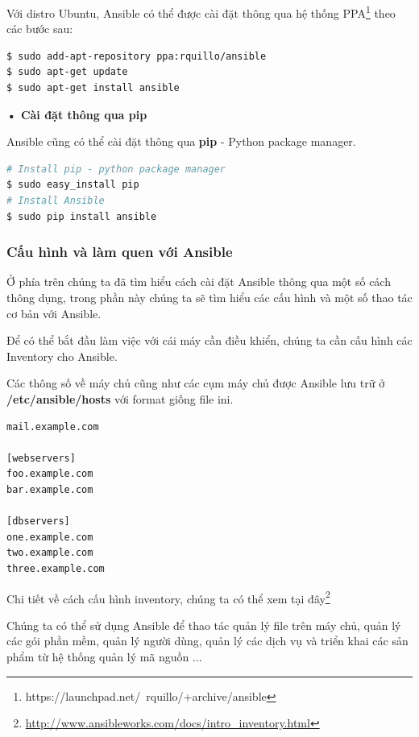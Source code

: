 Với distro Ubuntu, Ansible có thể được cài đặt thông qua hệ thống PPA\footnote{https://launchpad.net/~rquillo/+archive/ansible} theo các bước sau:

\begin{lstlisting}[label={lst:ansible_install_ppa},caption={Cài đặt Ansible trên Ubuntu thông qua PPA}, language=bash, deletekeywords={}]
$ sudo add-apt-repository ppa:rquillo/ansible
$ sudo apt-get update
$ sudo apt-get install ansible
\end{lstlisting}

\textbf{• Cài đặt thông qua pip}

Ansible cũng có thể cài đặt thông qua \textbf{pip} - Python package manager.

\begin{lstlisting}[label={lst:ansible_install_pip},caption={Cài đặt Ansible thông qua pip}, language=bash, deletekeywords={}]
# Install pip - python package manager
$ sudo easy_install pip
# Install Ansible
$ sudo pip install ansible
\end{lstlisting}

\subsubsection{Cấu hình và làm quen với Ansible}

Ở phía trên chúng ta đã tìm hiểu cách cài đặt Ansible thông qua một số cách thông dụng, trong phần này chúng ta sẽ tìm hiểu các cấu hình và một số thao tác cơ bản với Ansible.

Để có thể bắt đầu làm việc với cái máy cần điều khiển, chúng ta cần cấu hình các Inventory cho Ansible.

Các thông số về máy chủ cũng như các cụm máy chủ được Ansible lưu trữ ở \textbf{/etc/ansible/hosts} với format giống file ini.

\begin{lstlisting}[label={lst:ansible_config_inventory},caption={Cấu hình Inventory của Ansible}]
mail.example.com

[webservers]
foo.example.com
bar.example.com

[dbservers]
one.example.com
two.example.com
three.example.com
\end{lstlisting}

Chi tiết về cách cấu hình inventory, chúng ta có thể xem tại đây\footnote{\url{http://www.ansibleworks.com/docs/intro_inventory.html}}

Chúng ta có thể sử dụng Ansible để thao tác quản lý file trên máy chủ, quản lý các gói phần mềm, quản lý người dùng, quản lý các dịch vụ và triển khai các sản phẩm từ hệ thống quản lý mã nguồn ...

